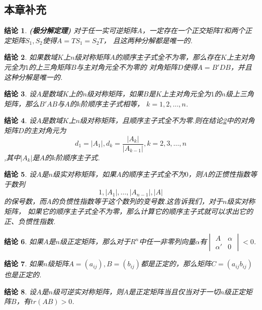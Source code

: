 \documentclass[UTF8]{article}
\newtheorem{ccl}{结论}[subsection]
\begin{document}
\subsection{本章补充}
\begin{ccl}
  \textbf{(极分解定理) }对于任一实可逆矩阵$A$，一定存在一个正交矩阵$T$和两个正定矩阵$S_1,S_2$使得$A=TS_1=S_2T$，
  且这两种分解都是唯一的.
\end{ccl}
\begin{ccl}\label{ccl1}
  如果数域$K$上$n$级对称矩阵$A$的顺序主子式全不为零，那么存在$K$上主对角元全为$1$的上三角矩阵$B$与主对角元全不为零的
  对角矩阵$D$使得$A=B'DB$，并且这种分解是唯一的.
\end{ccl}
\begin{ccl}
  设$A$是数域$K$上的$n$级对称矩阵，如果$B$是$K$上主对角元全为$1$的$n$级上三角矩阵，那么$B'AB$与$A$的$k$阶顺序主子式相等，
  $k=1,2,\ldots,n$.
\end{ccl}
\begin{ccl}
  设$A$是数域$K$上$n$级对称矩阵，且顺序主子式全不为零.则在结论\ref{ccl1}中的对角矩阵$D$的主对角元为\\
  $$d_1=|A_1|,d_k=\dfrac{|A_k|}{|A_{k-1}|},k=2,3,\ldots,n$$,其中$|A_k|$是$A$的$k$阶顺序主子式.
\end{ccl}
\begin{ccl}
  设$A$是$n$级实对称矩阵，如果$A$的顺序主子式全不为$0$，则$A$的正惯性指数等于数列\\
  $$1,|A_1|,\ldots,|A_{n-1}|,|A|$$的保号数，而$A$的负惯性指数等于这个数列的变号数.这告诉我们，对于$n$级实对称矩阵，
  如果它的顺序主子式全不为零，那么计算它的顺序主子式就可以求出它的正、负惯性指数.
\end{ccl}
\begin{ccl}
  如果$A$是$n$级正定矩阵，那么对于$R^n$中任一非零列向量$\alpha$有$\begin{vmatrix}A&\alpha \\ \alpha'&0 \end{vmatrix}<0$.
\end{ccl}
\begin{ccl}
  如果$n$级矩阵$A=(a_{ij}),B=(b_{ij})$都是正定的，那么矩阵$C=(a_{ij}b_{ij})$也是正定的.
\end{ccl}
\begin{ccl}
  设$A$是$n$级可逆实对称矩阵，则$A$是正定矩阵当且仅当对于一切$n$级正定矩阵$B$，有$tr(AB)>0$.
\end{ccl}
\end{document}

